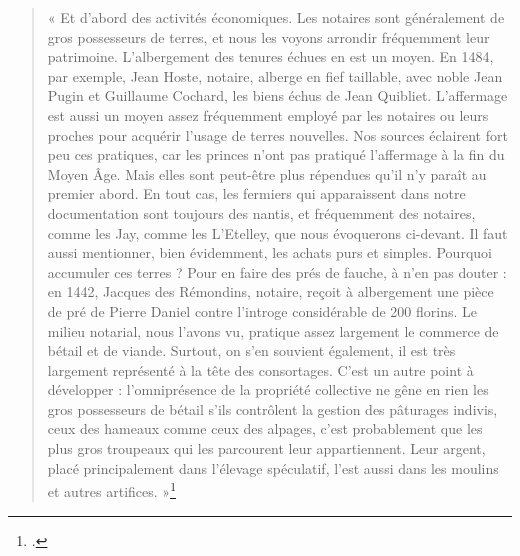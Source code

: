 \documentclass[12pt,a4paper]{report}
\begin{document}
\begin{quote}
	« Et d’abord des activités économiques. Les notaires sont généralement de gros possesseurs de terres, et nous les voyons arrondir fréquemment leur patrimoine. L’albergement des tenures échues en est un moyen. En 1484, par exemple, Jean Hoste, notaire, alberge en fief taillable, avec noble Jean Pugin et Guillaume Cochard, les biens échus de Jean Quibliet. L’affermage est aussi un moyen assez fréquemment employé par les notaires ou leurs proches pour acquérir l’usage de terres nouvelles. Nos sources éclairent fort peu ces pratiques, car les princes n’ont pas pratiqué l’affermage à la fin du Moyen Âge. Mais elles sont peut-être plus répendues qu’il n’y paraît au premier abord. En tout cas, les fermiers qui apparaissent dans notre documentation sont toujours des nantis, et fréquemment des notaires, comme les Jay, comme les L’Etelley, que nous évoquerons ci-devant. Il faut aussi mentionner, bien évidemment, les achats purs et simples.
	Pourquoi accumuler ces terres ? Pour en faire des prés de fauche, à n’en pas douter : en 1442, Jacques des Rémondins, notaire, reçoit à albergement une pièce de pré de Pierre Daniel contre l’introge considérable de 200 florins. Le milieu notarial, nous l’avons vu, pratique assez largement le commerce de bétail et de viande. Surtout, on s’en souvient également, il est très largement représenté à la tête des consortages. C’est un autre point à développer : l’omniprésence de la propriété collective ne gêne en rien les gros possesseurs de bétail s’ils contrôlent la gestion des pâturages indivis, ceux des hameaux comme ceux des alpages, c’est probablement que les plus gros troupeaux qui les parcourent leur appartiennent. Leur argent, placé principalement dans l’élevage spéculatif, l'est aussi dans les moulins et autres artifices. »\footcite[488]{Carrier2001VieMontagnardeFaucigny}
\end{quote}
\end{document}
